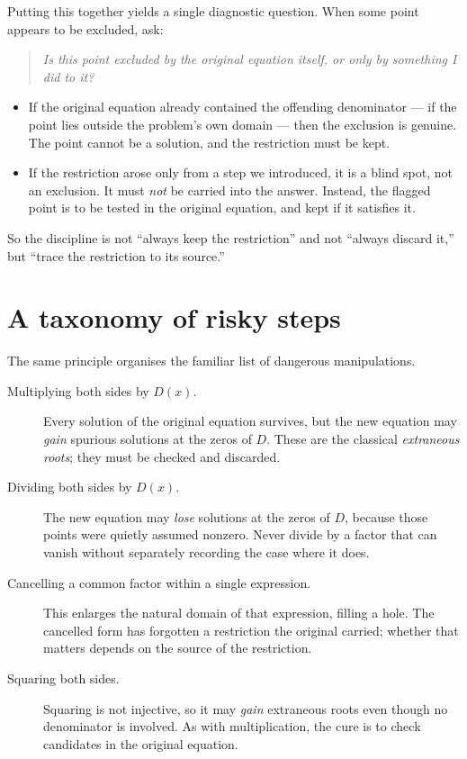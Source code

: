 \documentclass{essay}
\begin{document}
Putting this together yields a single diagnostic question. When some point appears to be
excluded, ask:
\begin{quote}
  \emph{Is this point excluded by the original equation itself, or only by something I did to
  it?}
\end{quote}
\begin{itemize}
  \item If the original equation already contained the offending denominator --- if the point
    lies outside the problem's own domain --- then the exclusion is genuine. The point cannot be
    a solution, and the restriction must be kept.
  \item If the restriction arose only from a step we introduced, it is a blind spot, not an
    exclusion. It must \emph{not} be carried into the answer. Instead, the flagged point is to
    be tested in the original equation, and kept if it satisfies it.
\end{itemize}
So the discipline is not ``always keep the restriction'' and not ``always discard it,'' but
``trace the restriction to its source.''

\section{A taxonomy of risky steps}

The same principle organises the familiar list of dangerous manipulations.
\begin{description}
  \item[Multiplying both sides by $D(x)$.] Every solution of the original equation survives,
    but the new equation may \emph{gain} spurious solutions at the zeros of $D$. These are the
    classical \emph{extraneous roots}; they must be checked and discarded.
  \item[Dividing both sides by $D(x)$.] The new equation may \emph{lose} solutions at the
    zeros of $D$, because those points were quietly assumed nonzero. Never divide by a factor
    that can vanish without separately recording the case where it does.
  \item[Cancelling a common factor within a single expression.] This enlarges the natural
    domain of that expression, filling a hole. The cancelled form has forgotten a restriction
    the original carried; whether that matters depends on the source of the restriction.
  \item[Squaring both sides.] Squaring is not injective, so it may \emph{gain} extraneous
    roots even though no denominator is involved. As with multiplication, the cure is to check
    candidates in the original equation.
\end{description}
\end{document}
